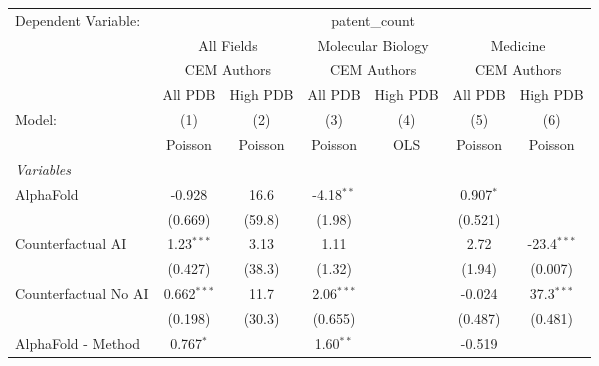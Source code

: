 \begingroup
\centering
\begin{tabular}{lcccccc}
   \tabularnewline \midrule \midrule
   Dependent Variable: & \multicolumn{6}{c}{patent\_count}\\
 & \multicolumn{2}{c}{All Fields} & \multicolumn{2}{c}{Molecular Biology} & \multicolumn{2}{c}{Medicine} \\
\cmidrule(lr){2-3} \cmidrule(lr){4-5} \cmidrule(lr){6-7}
 & \multicolumn{2}{c}{CEM Authors} & \multicolumn{2}{c}{CEM Authors} & \multicolumn{2}{c}{CEM Authors} \\
\cmidrule(lr){2-3} \cmidrule(lr){4-5} \cmidrule(lr){6-7}
 & \multicolumn{1}{c}{All PDB} & \multicolumn{1}{c}{High PDB} & \multicolumn{1}{c}{All PDB} & \multicolumn{1}{c}{High PDB} & \multicolumn{1}{c}{All PDB} & \multicolumn{1}{c}{High PDB} \\
\cmidrule(lr){2-2} \cmidrule(lr){3-3} \cmidrule(lr){4-4} \cmidrule(lr){5-5} \cmidrule(lr){6-6} \cmidrule(lr){7-7}
   Model:                                                     & (1)           & (2)     & (3)           & (4)  & (5)           & (6)\\  
                                                              &  Poisson      & Poisson & Poisson       & OLS  & Poisson       & Poisson\\  
   \midrule
   \emph{Variables}\\
   AlphaFold                                                  & -0.928        & 16.6    & -4.18$^{**}$  &      & 0.907$^{*}$   &   \\   
                                                              & (0.669)       & (59.8)  & (1.98)        &      & (0.521)       &   \\   
   Counterfactual AI                                          & 1.23$^{***}$  & 3.13    & 1.11          &      & 2.72          & -23.4$^{***}$\\   
                                                              & (0.427)       & (38.3)  & (1.32)        &      & (1.94)        & (0.007)\\   
   Counterfactual No AI                                       & 0.662$^{***}$ & 11.7    & 2.06$^{***}$  &      & -0.024        & 37.3$^{***}$\\   
                                                              & (0.198)       & (30.3)  & (0.655)       &      & (0.487)       & (0.481)\\   
   AlphaFold - Method                                         & 0.767$^{*}$   &         & 1.60$^{**}$   &      & -0.519        &   \\   

\end{tabular}
